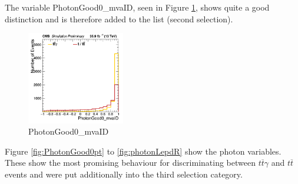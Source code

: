\documentclass[11pt]{scrartcl}
\begin{document}
The variable PhotonGood0\_mvaID, seen in Figure \ref{fig:PhotonGood0mvaID}, shows quite a good distinction and is therefore added to the list (second selection).

	\begin{figure}[H]
	\centering
	\includegraphics[width=0.38\textwidth]{figures/Select2/PhotonGood0_mvaID.png}
	\caption{PhotonGood0\_mvaID}
 	\label{fig:PhotonGood0mvaID}
	\end{figure}
	
Figure \ref{fig:PhotonGood0pt} to \ref{fig:photonLepdR} show the photon variables. These show the most promising behaviour for discriminating between $t\overline{t}\gamma$ and $t\overline{t}$ events and were put additionally into the third selection category.
\end{document}

